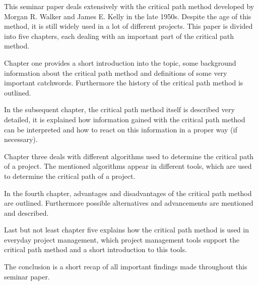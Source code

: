 This seminar paper deals extensively with the critical path method developed by
Morgan R. Walker and James E. Kelly in the late 1950s\cite{Kelley:1959:CPS:1460299.1460318}.
Despite the age of this
method, it is still widely used in a lot of different projects.  This paper is
divided into five chapters, each dealing with an important part of the critical
path method. 

Chapter one provides a short introduction into the topic, some background
information about the critical path method and definitions of some very
important catchwords. Furthermore the history of the critical path method is
outlined. 

In the subsequent chapter, the critical path method itself is described very
detailed, it is explained how information gained with the critical path method
can be interpreted and how to react on this information in a proper way (if
necessary).

Chapter three deals with different algorithms used to determine the critical
path of a project.  The mentioned algorithms appear in different tools, which
are used to determine the critical path of a project. 

In the fourth chapter, advantages and disadvantages of the critical path method
are outlined. Furthermore possible alternatives and advancements are mentioned
and described. 

Last but not least chapter five explains how the critical path method is used in
everyday project management, which project management tools support the critical
path method and a short introduction to this tools.

The conclusion is a short recap of all important findings made throughout this
seminar paper.
